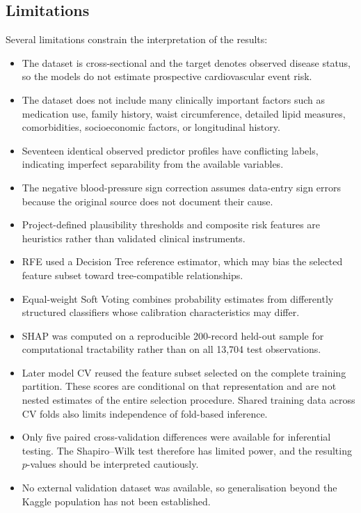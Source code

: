 \documentclass[11pt,a4paper]{article}
\begin{document}
\subsection{Limitations}

Several limitations constrain the interpretation of the results:
\begin{itemize}
    \item The dataset is cross-sectional and the target denotes observed disease status, so the models do not estimate prospective cardiovascular event risk.
    \item The dataset does not include many clinically important factors such as medication use, family history, waist circumference, detailed lipid measures, comorbidities, socioeconomic factors, or longitudinal history.
    \item Seventeen identical observed predictor profiles have conflicting labels, indicating imperfect separability from the available variables.
    \item The negative blood-pressure sign correction assumes data-entry sign errors because the original source does not document their cause.
    \item Project-defined plausibility thresholds and composite risk features are heuristics rather than validated clinical instruments.
    \item RFE used a Decision Tree reference estimator, which may bias the selected feature subset toward tree-compatible relationships.
    \item Equal-weight Soft Voting combines probability estimates from differently structured classifiers whose calibration characteristics may differ.
    \item SHAP was computed on a reproducible 200-record held-out sample for computational tractability rather than on all 13,704 test observations.
    \item Later model CV reused the feature subset selected on the complete training partition. These scores are conditional on that representation and are not nested estimates of the entire selection procedure. Shared training data across CV folds also limits independence of fold-based inference.
    \item Only five paired cross-validation differences were available for inferential testing. The Shapiro--Wilk test therefore has limited power, and the resulting $p$-values should be interpreted cautiously.
    \item No external validation dataset was available, so generalisation beyond the Kaggle population has not been established.
\end{itemize}
\end{document}
